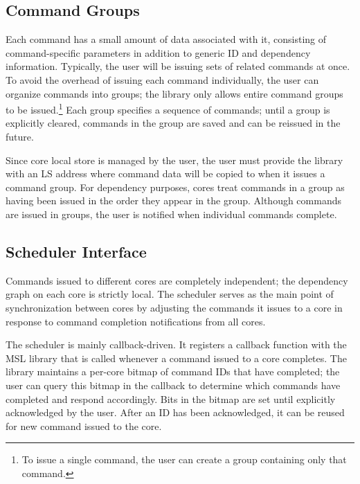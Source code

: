 \subsection{Command Groups}

Each command has a small amount of data associated with it, consisting
of command-specific parameters in addition to generic ID and
dependency information. Typically, the user will be issuing sets of
related commands at once. To avoid the overhead of issuing each
command individually, the user can organize commands into groups; the
library only allows entire command groups to be issued.\footnote{To
issue a single command, the user can create a group containing only
that command.} Each group specifies a sequence of commands; until a
group is explicitly cleared, commands in the group are saved and can
be reissued in the future.

Since core local store is managed by the user, the user must provide
the library with an LS address where command data will be copied to
when it issues a command group. For dependency purposes, cores treat
commands in a group as having been issued in the order they appear in
the group. Although commands are issued in groups, the user is
notified when individual commands complete.

\subsection{Scheduler Interface}

Commands issued to different cores are completely independent; the
dependency graph on each core is strictly local. The scheduler serves
as the main point of synchronization between cores by adjusting the
commands it issues to a core in response to command completion
notifications from all cores.

The scheduler is mainly callback-driven. It registers a callback
function with the MSL library that is called whenever a command issued
to a core completes. The library maintains a per-core bitmap of
command IDs that have completed; the user can query this bitmap in the
callback to determine which commands have completed and respond
accordingly. Bits in the bitmap are set until explicitly acknowledged
by the user. After an ID has been acknowledged, it can be reused for
new command issued to the core.


